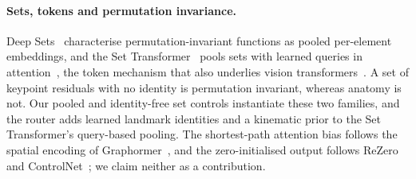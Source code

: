 \paragraph{Sets, tokens and permutation invariance.}
Deep Sets~\cite{zaheer2017deepsets} characterise permutation-invariant functions as pooled per-element embeddings, and the Set Transformer~\cite{lee2019settransformer} pools sets with learned queries in attention~\cite{vaswani2017attention}, the token mechanism that also underlies vision transformers~\cite{dosovitskiy2021vit}.
A set of keypoint residuals with no identity is permutation invariant, whereas anatomy is not.
Our pooled and identity-free set controls instantiate these two families, and the router adds learned landmark identities and a kinematic prior to the Set Transformer's query-based pooling.
The shortest-path attention bias follows the spatial encoding of Graphormer~\cite{ying2021graphormer}, and the zero-initialised output follows ReZero~\cite{bachlechner2021rezero} and ControlNet~\cite{zhang2023controlnet}; we claim neither as a contribution.
